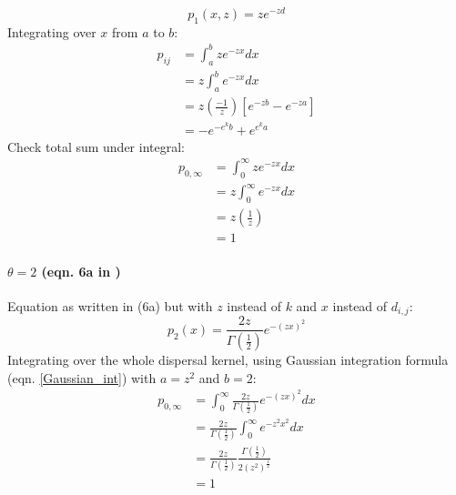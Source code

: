 \documentclass[12pt, oneside]{article}   	%
\begin{document}
\begin{equation}
p_1(x,z) = z e^{-zd}
\end{equation}
Integrating over $x$ from $a$ to $b$:
\begin{equation}
	\begin{split}
	p_{ij} & = \int_a^bz e^{-zx} dx \\
		   & = z \int_a^b e^{-zx} dx \\
		   & = z (\frac{-1}{z})[e^{-zb} - e^{-za}] \\
		   & = -e^{-e^kb} + e^{e^ka}
	\end{split}
\end{equation}
Check total sum under integral:
\begin{equation}
	\begin{split}
	p_{0,\infty} & = \int_0^{\infty}z e^{-zx} dx \\
			   & = z \int_0^{\infty} e^{-zx} dx \\
			   & = z(\frac{1}{z}) \\
			   & = 1
	\end{split}
\end{equation}

\paragraph*{$\theta = 2$ (eqn. 6a in \cite{bode2018estimating})}
Equation as written in \cite{bode2018estimating} (6a) but with $z$ instead of $k$ and $x$ instead of $d_{i,j}$:
\begin{equation}
p_2(x) = \frac{2z}{\Gamma(\frac{1}{2})} e^{-(zx)^2}
\end{equation}
Integrating over the whole dispersal kernel, using Gaussian integration formula (eqn. \ref{Gaussian_int}) with $a = z^2$ and $b = 2$:
\begin{equation}
	\begin{split}
	p_{0, \infty} & = \int_0^{\infty} \frac{2z}{\Gamma(\frac{1}{2})} e^{-(zx)^2} dx \\
				  & = \frac{2z}{\Gamma(\frac{1}{2})} \int_0^{\infty} e^{-z^2x^2} dx \\
				  & = \frac{2z}{\Gamma(\frac{1}{2})} \frac{\Gamma(\frac{1}{2})}{2(z^2)^{\frac{1}{2}}} \\
				  & = 1
	\end{split}
\end{equation}
\end{document}
